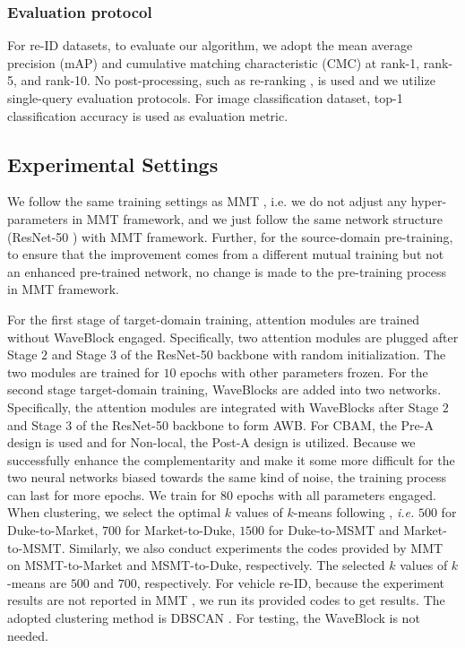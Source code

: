 \documentclass[journal]{IEEEtran}
\begin{document}
\subsubsection{Evaluation protocol} For re-ID datasets, to evaluate our algorithm, we adopt the mean average precision (mAP) and cumulative matching characteristic (CMC) at rank-1, rank-5, and rank-10. No post-processing, such as re-ranking \cite{zhong2017re}, is used and we utilize single-query evaluation protocols. For image classification dataset, top-1 classification accuracy is used as evaluation metric. 
\subsection{Experimental Settings}
We follow the same training settings as MMT \cite{ge2020mutual}, i.e. we do not adjust any hyper-parameters in MMT \cite{ge2020mutual} framework, and we just follow the same network structure (ResNet-50 \cite{he2016deep}) with MMT \cite{ge2020mutual} framework. Further, for the source-domain pre-training, to ensure that the improvement comes from a different mutual training but not an enhanced pre-trained network, no change is made to the pre-training process in MMT \cite{ge2020mutual} framework. \par

For the first stage of target-domain training, attention modules are trained without WaveBlock engaged. Specifically, two attention modules are plugged after Stage $2$ and Stage $3$ of the ResNet-50 \cite{he2016deep} backbone with random initialization. The two modules are trained for $10$ epochs with other parameters frozen. For the second stage target-domain training, WaveBlocks are added into two networks. Specifically, the attention modules are integrated with WaveBlocks after Stage $2$ and Stage $3$ of the ResNet-50 \cite{he2016deep} backbone to form AWB. For CBAM, the Pre-A design is used and for Non-local, the Post-A design is utilized. Because we successfully enhance the complementarity and make it some more difficult for the two neural networks biased towards the same kind of noise, the training process can last for more epochs. We train for $80$ epochs with all parameters engaged. When clustering, we select the optimal $k$ values of $k$-means following \cite{ge2020mutual}, \textit{i.e.} $500$ for Duke-to-Market, $700$ for Market-to-Duke, $1500$ for Duke-to-MSMT and Market-to-MSMT. Similarly, we also conduct experiments the codes provided by MMT \cite{ge2020mutual} on MSMT-to-Market and MSMT-to-Duke, respectively. The selected $k$ values of $k$-means are $500$ and $700$, respectively.
For vehicle re-ID, because the experiment results are not reported in MMT \cite{ge2020mutual}, we run its provided codes to get results. The adopted clustering method is DBSCAN \cite{ester1996density}.
For testing, the WaveBlock is not needed.\par 
\end{document}
